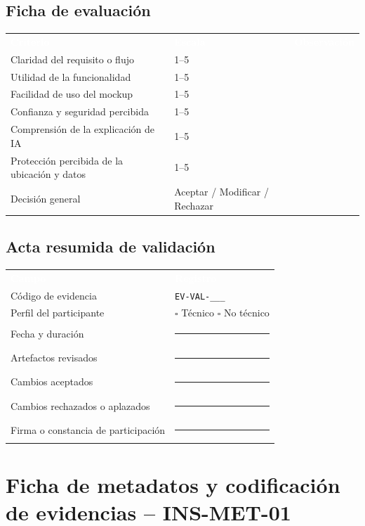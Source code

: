 \documentclass[10pt,a4paper]{article}
\begin{document}
\subsection{Ficha de evaluación}

\noindent\begin{tabularx}{\textwidth}{J C{2.5cm} J}
\textcolor{white}{\textbf{Criterio}} &
\textcolor{white}{\textbf{Escala}} &
\textcolor{white}{\textbf{Observación}}\\
Claridad del requisito o flujo & 1--5 & \\
Utilidad de la funcionalidad & 1--5 & \\
Facilidad de uso del mockup & 1--5 & \\
Confianza y seguridad percibida & 1--5 & \\
Comprensión de la explicación de IA & 1--5 & \\
Protección percibida de la ubicación y datos & 1--5 & \\
Decisión general & Aceptar / Modificar / Rechazar & \\
\end{tabularx}

\subsection{Acta resumida de validación}

\noindent\begin{tabularx}{\textwidth}{L{4.3cm} J}
\textcolor{white}{\textbf{Campo}} & \textcolor{white}{\textbf{Registro}}\\
Código de evidencia & \texttt{EV-VAL-\_\_\_}\\
Perfil del participante & $\square$ Técnico \quad $\square$ No técnico\\
Fecha y duración & \rule{6.0cm}{0.4pt}\\
Artefactos revisados & \rule{6.0cm}{0.4pt}\\
Cambios aceptados & \rule{6.0cm}{0.4pt}\\
Cambios rechazados o aplazados & \rule{6.0cm}{0.4pt}\\
Firma o constancia de participación & \rule{6.0cm}{0.4pt}\\
\end{tabularx}

\section{Ficha de metadatos y codificación de evidencias -- INS-MET-01}
\end{document}
